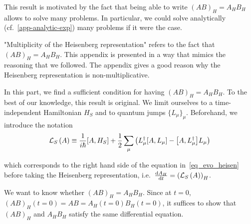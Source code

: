 This result is motivated by the fact that being able to write $(A B)_H = A_H B_H$ allows to solve many problems. In particular, we could solve analytically (cf.\@~\autoref{app-analytic-exp}) many problems if it were the case.

"Multiplicity of the Heisenberg representation" refers to the fact that $(A B)_H = A_H B_H$. This appendix is presented in a way that mimics the reasoning that we followed. The appendix gives a good reason why the Heisenberg representation is non-multiplicative.

In this part, we find a sufficient condition for having $(A B)_H = A_H B_H$. To the best of our knowledge, this result is original. We limit ourselves to a time-independent Hamiltonian $H_S$ and to quantum jumps $\{L_\mu\}_\mu$. Beforehand, we introduce the notation
\begin{equation}
    \LS{A} \equiv \ihbar \commutator{A}{H_S} + \frac{1}{2} \sum_\mu \left( L^\dagger_\mu \commutator{A}{L_\mu}  - \commutator{A}{L^\dagger_\mu} L_\mu \right)
\end{equation}

which corresponds to the right hand side of the equation in~\autoref{eq_evo_heisen} before taking the Heisenberg representation, i.e.\@~$\dv{A_H}{t} = \left(\mathcal{L}_S\left(A\right)\right)_H$.

We want to know whether $(A B)_H = A_H B_H$. Since at $t=0$, $(A B)_H(t=0) = A B = A_H(t=0) B_H(t=0)$, it suffices to show that $(A B)_H$ and $A_H B_H$ satisfy the same differential equation.

